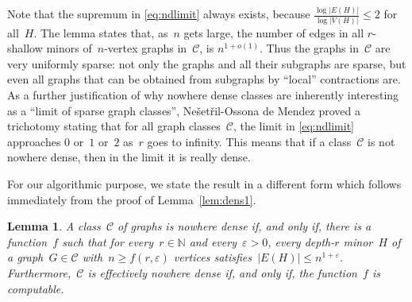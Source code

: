 \documentclass[11pt]{article}
\newtheorem{lemma}[theorem]{Lemma}
\newtheorem{corollary}[theorem]{Corollary}
\numberwithin{equation}{section}
\newcommand{\minor}{\preceq}
\newcommand{\N}{{\mathbb N}} \newcommand{\Q}{{\mathbb Q}}
\newcommand{\CCC}{\mathcal{C}} \newcommand{\DDD}{\mathcal{D}}
\renewcommand{\epsilon}{\varepsilon}
\begin{document}
Note that the supremum in \eqref{eq:ndlimit} always exists, because
$\frac{\log|E(H)|}{\log|V(H)|}\le 2$ for all~$H$.  The lemma states
that, as~$n$ gets large, the number of edges in all $r$-shallow minors
of~$n$-vertex graphs in~$\CCC$, is $n^{1+o(1)}$. Thus the graphs
in~$\CCC$ are very uniformly sparse: not only the graphs and all their
subgraphs are sparse, but even all graphs that can be obtained from
subgraphs by ``local'' contractions are. As a further justification of
why nowhere dense classes are inherently interesting as a ``limit of
sparse graph classes'', Ne{\v s}et{\v r}il-Ossona de Mendez proved a
trichotomy stating that for all graph classes~$\CCC$, the limit in
\eqref{eq:ndlimit} approaches $0$ or~$1$ or~$2$ as~$r$ goes to
infinity. This means that if a class~$\CCC$ is not nowhere dense, then
in the limit it is really dense.

For our algorithmic purpose, we state the result in a different form
which follows immediately from the proof of
Lemma~\ref{lem:dens1}.

\begin{lemma}\label{thm:densitycharacterization}
  A class~$\CCC$ of graphs is nowhere dense if, and only if, there is
  a function~$f$ such that for every~$r\in \N$ and every~$\epsilon>0$,
  every depth-$r$ minor~$H$ of a graph~$G\in\CCC$ with~$n\geq
  f(r,\epsilon)$ vertices satisfies~$|E(H)|\leq
  n^{1+\epsilon}$. Furthermore,~$\CCC$ is effectively nowhere dense
  if, and only if, the function~$f$ is computable.
\end{lemma}



\end{document}
